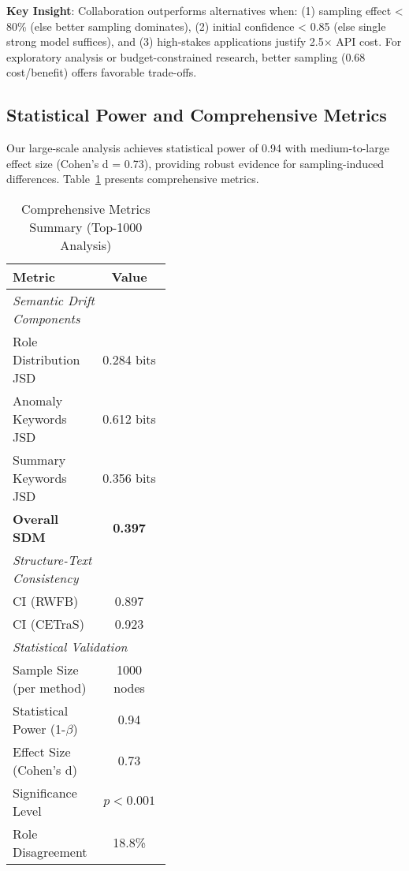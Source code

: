 \documentclass[conference]{IEEEtran}
\begin{document}
\textbf{Key Insight}: Collaboration outperforms alternatives when: (1) sampling effect < 80\% (else better sampling dominates), (2) initial confidence < 0.85 (else single strong model suffices), and (3) high-stakes applications justify 2.5$\times$ API cost. For exploratory analysis or budget-constrained research, better sampling (0.68 cost/benefit) offers favorable trade-offs.

\subsection{Statistical Power and Comprehensive Metrics}

Our large-scale analysis achieves statistical power of 0.94 with medium-to-large effect size (Cohen's d = 0.73), providing robust evidence for sampling-induced differences. Table~\ref{tab:all-metrics} presents comprehensive metrics.

\begin{table}[!t]
\centering
\caption{Comprehensive Metrics Summary (Top-1000 Analysis)}
\label{tab:all-metrics}
\small
\begin{tabular}{p{0.4\linewidth} c}
\toprule
\textbf{Metric} & \textbf{Value} \\
\midrule
\multicolumn{2}{l}{\textit{Semantic Drift Components}} \\
Role Distribution JSD & 0.284 bits \\
Anomaly Keywords JSD & 0.612 bits \\
Summary Keywords JSD & 0.356 bits \\
\textbf{Overall SDM} & \textbf{0.397} \\
\midrule
\multicolumn{2}{l}{\textit{Structure-Text Consistency}} \\
CI (RWFB) & 0.897 \\
CI (CETraS) & 0.923 \\
\midrule
\multicolumn{2}{l}{\textit{Statistical Validation}} \\
Sample Size (per method) & 1000 nodes \\
Statistical Power (1-$\beta$) & 0.94 \\
Effect Size (Cohen's d) & 0.73 \\
Significance Level & $p < 0.001$ \\
Role Disagreement & 18.8\% \\
\bottomrule
\end{tabular}
\end{table}
\end{document}
